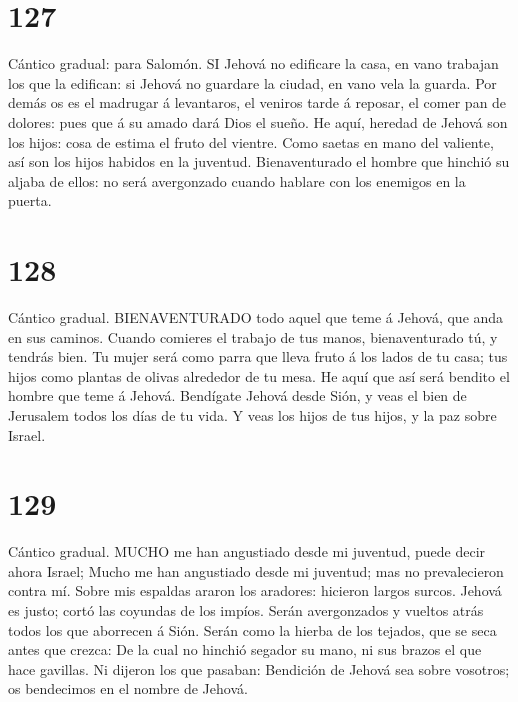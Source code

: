 \hypertarget{section-126}{%
\section{127}\label{section-126}}

 Cántico gradual: para Salomón. SI Jehová no edificare la
casa, en vano trabajan los que la edifican: si Jehová no guardare la
ciudad, en vano vela la guarda.  Por demás os es el madrugar
á levantaros, el veniros tarde á reposar, el comer pan de dolores: pues
que á su amado dará Dios el sueño.  He aquí, heredad de
Jehová son los hijos: cosa de estima el fruto del vientre. 
Como saetas en mano del valiente, así son los hijos habidos en la
juventud.  Bienaventurado el hombre que hinchió su aljaba de
ellos: no será avergonzado cuando hablare con los enemigos en la puerta.

\hypertarget{section-127}{%
\section{128}\label{section-127}}

 Cántico gradual. BIENAVENTURADO todo aquel que teme á
Jehová, que anda en sus caminos.  Cuando comieres el trabajo
de tus manos, bienaventurado tú, y tendrás bien.  Tu mujer
será como parra que lleva fruto á los lados de tu casa; tus hijos como
plantas de olivas alrededor de tu mesa.  He aquí que así
será bendito el hombre que teme á Jehová.  Bendígate Jehová
desde Sión, y veas el bien de Jerusalem todos los días de tu vida.
 Y veas los hijos de tus hijos, y la paz sobre Israel.

\hypertarget{section-128}{%
\section{129}\label{section-128}}

 Cántico gradual. MUCHO me han angustiado desde mi juventud,
puede decir ahora Israel;  Mucho me han angustiado desde mi
juventud; mas no prevalecieron contra mí.  Sobre mis
espaldas araron los aradores: hicieron largos surcos. 
Jehová es justo; cortó las coyundas de los impíos.  Serán
avergonzados y vueltos atrás todos los que aborrecen á Sión.
 Serán como la hierba de los tejados, que se seca antes que
crezca:  De la cual no hinchió segador su mano, ni sus
brazos el que hace gavillas.  Ni dijeron los que pasaban:
Bendición de Jehová sea sobre vosotros; os bendecimos en el nombre de
Jehová.

